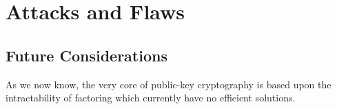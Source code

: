 
\chapter{Attacks and Flaws} %
\label{Chapter8}

\section{Future Considerations}

As we now know, the very core of public-key cryptography is based upon the intractability of factoring which currently have no efficient solutions. 